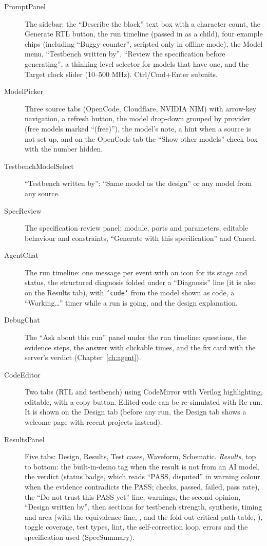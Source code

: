 \begin{description}
  \item[PromptPanel] The sidebar: the ``Describe the block'' text box with a character count, the Generate RTL button, the run timeline (passed in as a child), four example chips (including ``Buggy counter'', scripted only in offline mode), the Model menu, ``Testbench written by'', ``Review the specification before generating'', a thinking-level selector for models that have one, and the Target clock slider (10--500 MHz). Ctrl/Cmd+Enter submits.
  \item[ModelPicker] Three source tabs (OpenCode, Cloudflare, NVIDIA NIM) with arrow-key navigation, a refresh button, the model drop-down grouped by provider (free models marked ``(free)''), the model's note, a hint when a source is not set up, and on the OpenCode tab the ``Show other models'' check box with the number hidden.
  \item[TestbenchModelSelect] ``Testbench written by'': ``Same model as the design'' or any model from any source.
  \item[SpecReview] The specification review panel: module, ports and parameters, editable behaviour and constraints, ``Generate with this specification'' and Cancel.
  \item[AgentChat] The run timeline: one message per event with an icon for its stage and status, the structured diagnosis folded under a ``Diagnosis'' line (it is also on the Results tab), with \texttt{`code`} from the model shown as code, a ``Working\ldots'' timer while a run is going, and the design explanation.
  \item[DebugChat] The ``Ask about this run'' panel under the run timeline: questions, the evidence steps, the answer with clickable times, and the fix card with the server's verdict (Chapter~\ref{ch:agent}).
  \item[CodeEditor] Two tabs (RTL and testbench) using CodeMirror with Verilog highlighting, editable, with a copy button. Edited code can be re-simulated with Re-run. It is shown on the Design tab (before any run, the Design tab shows a welcome page with recent projects instead).
  \item[ResultsPanel] Five tabs: Design, Results, Test cases, Waveform, Schematic. \emph{Results}, top to bottom: the built-in-demo tag when the result is not from an AI model, the verdict (status badge, which reads ``PASS, disputed'' in warning colour when the evidence contradicts the PASS; checks, passed, failed, pass rate), the ``Do not trust this PASS yet'' line, warnings, the second opinion, ``Design written by'', then sections for testbench strength, synthesis, timing and area (with the equivalence line, , and the fold-out critical path table, ), toggle coverage, test types, lint, the self-correction loop, errors and the specification used (SpecSummary).

\end{description}
